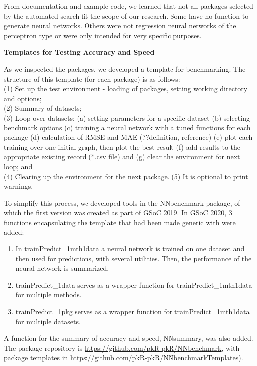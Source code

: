 From documentation and example code, we learned that not all packages
selected by the automated search fit the scope of our research. Some
have no function to generate neural networks. Others were not regression
neural networks of the perceptron type or were only intended for very
specific purposes.

\textbf{Templates for Testing Accuracy and Speed}

As we inspected the packages, we developed a template for benchmarking.
The structure of this template (for each package) is as follows:\\
(1) Set up the test environment - loading of packages, setting working
directory and options;\\
(2) Summary of datasets;\\
(3) Loop over datasets: (a) setting parameters for a specific dataset
(b) selecting benchmark options (c) training a neural network with a
tuned functions for each package (d) calculation of RMSE and MAE
(??definition, reference) (e) plot each training over one initial graph,
then plot the best result (f) add results to the appropriate existing
record (*.csv file) and (g) clear the environment for next loop; and\\
(4) Clearing up the environment for the next package. (5) It is optional
to print warnings.

To simplify this process, we developed tools in the NNbenchmark package,
of which the first version was created as part of GSoC 2019. In GSoC
2020, 3 functions encapsulating the template that had been made generic
with  were added:

\begin{enumerate}
\def\labelenumi{\arabic{enumi}.}
\tightlist
\item
  In trainPredict\_1mth1data a neural network is trained on one dataset
  and then used for predictions, with several utilities. Then, the
  performance of the neural network is summarized.
\item
  trainPredict\_1data serves as a wrapper function for
  trainPredict\_1mth1data for multiple methods.
\item
  trainPredict\_1pkg serves as a wrapper function for
  trainPredict\_1mth1data for multiple datasets.
\end{enumerate}

A function for the summary of accuracy and speed, NNsummary, was also
added. The package repository is
\url{https://github.com/pkR-pkR/NNbenchmark}, with package templates in
\url{https://github.com/pkR-pkR/NNbenchmarkTemplates}).

